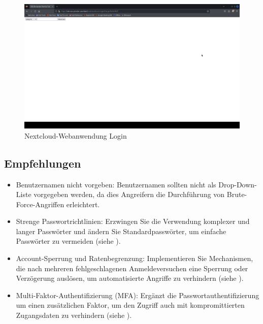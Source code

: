 \begin{figure}[!ht]
    \centering
    \includegraphics[width=\linewidth]{images/screenshots/06_nextcloud.png}
    \caption{Nextcloud-Webanwendung Login}
    \label{fig:04_nextcloud_login}
\end{figure}

\subsection*{Empfehlungen}
\begin{itemize}
    \item Benutzernamen nicht vorgeben: Benutzernamen sollten nicht als Drop-Down-Liste vorgegeben werden, da dies Angreifern die Durchführung von Brute-Force-Angriffen erleichtert.
    \item Strenge Passwortrichtlinien: Erzwingen Sie die Verwendung komplexer und langer Passwörter und ändern Sie Standardpasswörter, um einfache Passwörter zu vermeiden (siehe \cite{bsi_passwords}).
    \item Account-Sperrung und Ratenbegrenzung: Implementieren Sie Mechanismen, die nach mehreren fehlgeschlagenen Anmeldeversuchen eine Sperrung oder Verzögerung auslösen, um automatisierte Angriffe zu verhindern (siehe \cite{owaspAuthenticationOWASP}).
    \item Multi-Faktor-Authentifizierung (MFA): Ergänzt die Passwortauthentifizierung um einen zusätzlichen Faktor, um den Zugriff auch mit kompromittierten Zugangsdaten zu verhindern (siehe \cite{owaspAuthenticationOWASP}).
\end{itemize}


